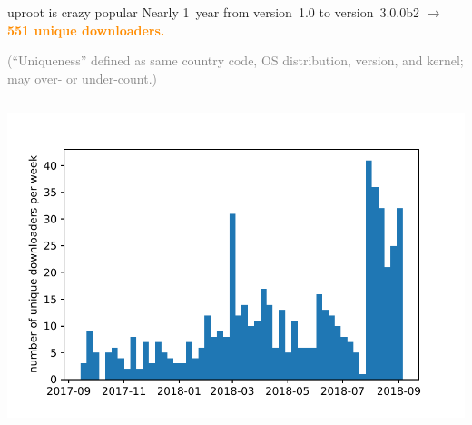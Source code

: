 \documentclass[aspectratio=169]{beamer}
\begin{document}
\begin{frame}{uproot is crazy popular}
\vspace{0.5 cm}
Nearly 1~year from version~1.0 to version~3.0.0b2 $\to$ \textcolor{darkorange}{\bf 551 unique downloaders.}

\textcolor{gray}{\scriptsize (``Uniqueness'' defined as same country code, OS distribution, version, and kernel; may over- or under-count.)}

\begin{columns}
\includegraphics[height=4.7 cm]{uproot-pip-vsweek.pdf}

\end{columns}
\end{frame}
\end{document}
